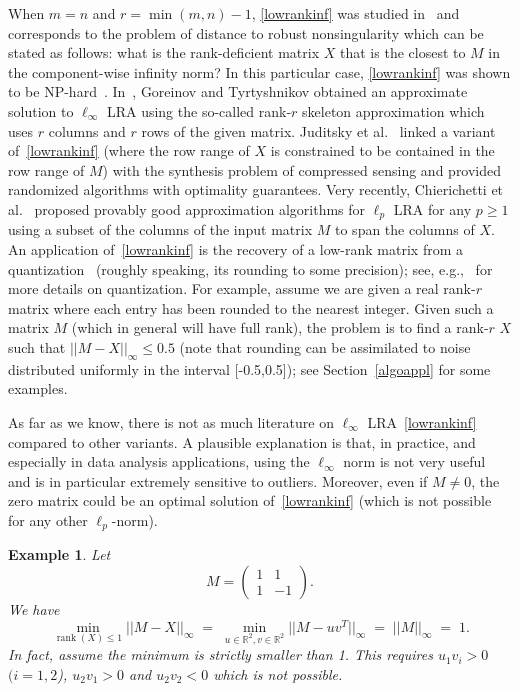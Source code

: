 \documentclass[a4paper,11pt]{article}
\newtheorem{example}{Example}
\numberwithin{equation}{section}
\DeclareMathOperator{\rank}{rank}
\begin{document}
When $m=n$ and $r=\min(m,n)-1$, \eqref{lowrankinf} was studied in~\cite{PR93} and corresponds to the problem of distance to robust nonsingularity which can be stated as follows: what is the rank-deficient matrix $X$ that is the closest to $M$ in the component-wise infinity norm? In this particular case, \eqref{lowrankinf} was shown to be NP-hard~\cite{PR93}. 
In~\cite{GT01, GT11}, Goreinov and Tyrtyshnikov  obtained an approximate solution to $\ell_{\infty}$ LRA using the so-called rank-$r$ skeleton approximation which uses $r$ columns and $r$ rows of the given matrix.  
Juditsky et al.~\cite{juditsky2011low} linked a variant of~\eqref{lowrankinf} (where the row range of $X$ is constrained to be contained in the row range of $M$) with the synthesis problem of compressed sensing and provided randomized algorithms with optimality guarantees.  
Very recently, Chierichetti et al.~\cite{CGKe17} proposed 
provably good approximation algorithms for $\ell_p$ LRA for any $p \geq 1$ using a subset of the columns of the input matrix $M$ to span the columns of $X$. 
An application of~\eqref{lowrankinf} is the recovery of a low-rank matrix from a quantization~\cite{LJ17} (roughly speaking, its rounding to some precision); see, e.g.,~\cite{gersho1992vector} for more details on quantization. 
For example, assume we are given a real rank-$r$ matrix where each entry has been rounded to the nearest integer. Given such a matrix $M$ (which in general will have full rank), the problem is to find a rank-$r$ $X$ such that $||M-X||_{\infty} \leq 0.5$ (note that rounding can be assimilated to noise distributed uniformly in the interval [-0.5,0.5]); see Section~\ref{algoappl} for some examples.  

As far as we know, there is not as much literature on $\ell_{\infty}$ LRA~\eqref{lowrankinf} compared to other variants. 
A plausible explanation is that, in practice, and especially in data analysis applications, 
using the $\ell_{\infty}$ norm is not very useful and is in particular extremely sensitive to outliers. 
Moreover, even if $M \neq 0$, the zero matrix could be an optimal solution of~\eqref{lowrankinf} (which is not possible for any other $\ell_{p}$-norm). 
\begin{example} \label{ex1} 
Let 
\[
M = \left( \begin{array}{cc} 
1 & 1 \\ 1 & -1 
\end{array} \right). 
\]
We have 
\[ 
\min_{\rank(X) \leq 1} ||M - X||_{\infty} 
\;  = \;   
\min_{u \in \mathbb{R}^2,v \in \mathbb{R}^2} ||M-uv^T||_{\infty} \; = \;  ||M||_{\infty} \;  = \;  1. 
\]
In fact, assume the minimum is strictly smaller than 1. This requires $u_1 v_i > 0$ $(i=1,2$), $u_2 v_1 > 0$ and $u_2 v_2 < 0$ which is not possible. 
\end{example}
\end{document}
